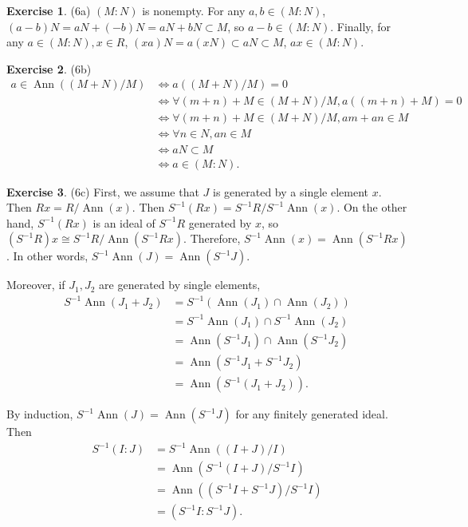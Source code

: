 \documentclass[12pt, psamsfonts]{amsart}
\theoremstyle{definition}
\newtheorem*{exer}{Exercise}
\theoremstyle{remark}
\DeclareMathOperator{\Ann}{Ann}
\numberwithin{equation}{section}
\begin{document}
\begin{exer}{(6a)}
  $(M:N)$ is nonempty.
  For any $a, b \in (M:N)$, $(a - b)N = aN + (-b)N = aN + bN \subset M$, so $a - b \in (M:N)$.
  Finally, for any $a \in (M:N), x \in R$, $(xa)N = a(xN) \subset aN \subset M$, $ax \in (M:N)$.
\end{exer}

\begin{exer}{(6b)}
  $ $
  \begin{align*}
    a \in \Ann((M + N) / M)
      &\iff a((M + N) / M) = 0 \\
      &\iff \forall (m + n) + M \in (M + N) / M, a((m + n) + M) = 0 \\
      &\iff \forall (m + n) + M \in (M + N) / M, am + an \in M \\
      &\iff \forall n \in N, an \in M \\
      &\iff aN \subset M \\
      &\iff a \in (M:N).
  \end{align*}
\end{exer}

\begin{exer}{(6c)}
  First, we assume that $J$ is generated by a single element $x$.
  Then $Rx = R / \Ann(x)$.
  Then $S^{-1}(Rx) = S^{-1}R / S^{-1}\Ann(x)$.
  On the other hand, $S^{-1}(Rx)$ is an ideal of $S^{-1}R$ generated by $x$, so $(S^{-1}R)x \cong S^{-1}R / \Ann(S^{-1}Rx)$.
  Therefore, $S^{-1}\Ann(x) = \Ann(S^{-1}Rx)$.
  In other words, $S^{-1}\Ann(J) = \Ann(S^{-1}J)$.

  Moreover, if $J_1, J_2$ are generated by single elements, 
  \begin{align*}
    S^{-1}\Ann(J_1 + J_2)
      &= S^{-1}(\Ann(J_1) \cap \Ann(J_2)) \\
      &= S^{-1}\Ann(J_1) \cap S^{-1}\Ann(J_2) \\
      &= \Ann(S^{-1}J_1) \cap \Ann(S^{-1}J_2) \\
      &= \Ann(S^{-1}J_1 + S^{-1}J_2) \\
      &= \Ann(S^{-1}(J_1 + J_2)).
  \end{align*}

  By induction, $S^{-1}\Ann(J) = \Ann(S^{-1}J)$ for any finitely generated ideal.
  Then 
  \begin{align*}
    S^{-1}(I:J)
      &= S^{-1}\Ann((I + J) / I) \\
      &= \Ann(S^{-1}(I + J) / S^{-1}I) \\
      &= \Ann((S^{-1}I + S^{-1}J) / S^{-1}I) \\
      &= (S^{-1}I:S^{-1}J).
  \end{align*}
\end{exer}
\end{document}
